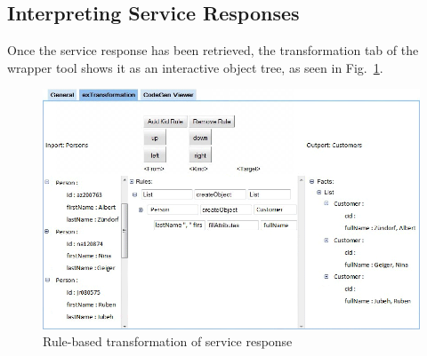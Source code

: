 % 
% 


\subsection{Interpreting Service Responses} %
\label{sub:interpreting_service_responses}



Once the service response has been retrieved, the transformation tab of the wrapper tool shows it as an interactive object tree, as seen in Fig.~\ref{fig:response_service_execution}. 

\begin{figure}[hb]
  \begin{center}     
    \includegraphics[width=\linewidth]{images/ServiceWrapperToolGVSWithTransformationRules-HQ.png}
    \caption{Rule-based transformation of service response}
    \label{fig:response_service_execution}
  \end{center}
\end{figure}

